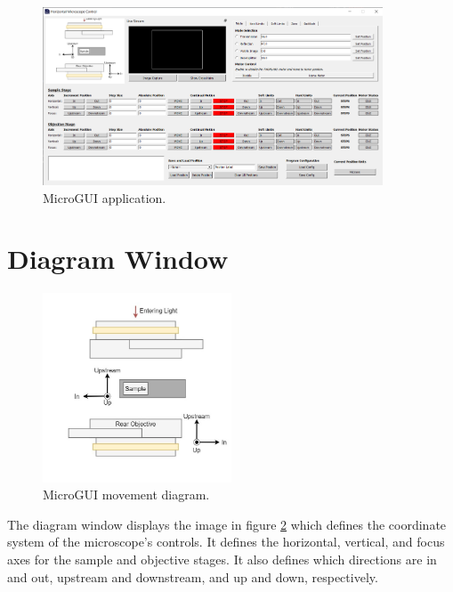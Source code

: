 \documentclass[a4paper, 12pt]{report}
\begin{document}
    \begin{figure}[h]
        \centering
        \includegraphics[width=0.9\textwidth]{figures/main_window.png}
        \caption{MicroGUI application.}
        \label{fig:1}
    \end{figure}
    
    
    \section{Diagram Window}
    \begin{figure}[h]
        \centering
        \includegraphics[width=0.5\textwidth]{figures/diagram.jpg}
        \caption{MicroGUI movement diagram.}
        \label{fig:2}
    \end{figure}
    
    The diagram window displays the image in figure \ref{fig:2} which defines the coordinate system of the microscope's controls. It defines the horizontal, vertical, and focus axes for the sample and objective stages. It also defines which directions are in and out, upstream and downstream, and up and down, respectively.
    
\end{document}
